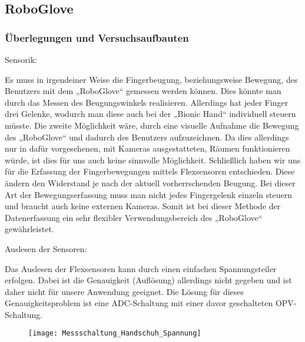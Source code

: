 \documentclass[11pt]{article}
\begin{document}
\subsection{RoboGlove}
\subsubsection{Überlegungen und Versuchsaufbauten}
Sensorik:

Es muss in irgendeiner Weise die Fingerbeugung, beziehungsweise Bewegung, des Benutzers mit dem „RoboGlove“ gemessen 
werden können. Dies könnte man durch das Messen des Beugungswinkels realisieren. Allerdings hat jeder Finger drei Gelenke, 
wodurch man diese auch bei der „Bionic Hand“ individuell steuern müsste. Die zweite Möglichkeit wäre, durch eine visuelle 
Aufnahme die Bewegung des „RoboGlove“ und dadurch des Benutzers aufzuzeichnen. Da dies allerdings nur in dafür vorgesehenen, 
mit Kameras ausgestatteten, Räumen funktionieren würde, ist dies für uns auch keine sinnvolle Möglichkeit. Schließlich haben 
wir uns für die Erfassung der Fingerbewegungen mittels Flexsensoren entschieden. Diese ändern den Widerstand je nach der 
aktuell vorherrschenden Beugung. Bei dieser Art der Bewegungserfassung muss man nicht jedes Fingergelenk einzeln steuern und 
braucht auch keine externen Kameras. Somit ist bei dieser Methode der Datenerfassung ein sehr flexibler Verwendungsbereich 
des „RoboGlove“ gewährleistet. 

Auslesen der Sensoren:

Das Auslesen der Flexsensoren kann durch einen einfachen Spannungsteiler erfolgen. Dabei ist die Genauigkeit (Auflösung) 
allerdings nicht gegeben und ist daher nicht für unsere Anwendung geeignet. Die Lösung für dieses Genauigkeitsproblem ist 
eine ADC-Schaltung mit einer davor geschalteten OPV-Schaltung.

\begin{figure}[h]
	\begin{center}
	\scalebox{0.5}
	{\texttt{[image: Messschaltung\_Handschuh\_Spannung]}}
	\end{center}
\end{figure}
\end{document}
